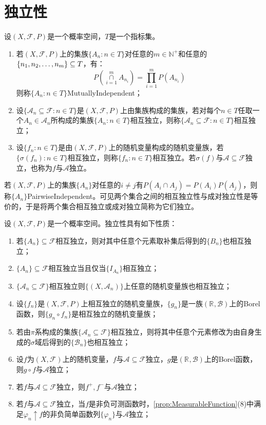 \section{独立性}
\begin{definition}
	设$(X,\mathscr{F},P)$是一个概率空间，$T$是一个指标集。
	\begin{enumerate}
		\item 若$(X,\mathscr{F},P)$上的集族$\{A_n:n\in T\}$对任意的$m\in\mathbb{N}^+$和任意的$\{n_1, n_2, \dots, n_{m}\}\subseteq T$，有：
		\begin{equation*}
			P\left(\underset{i=1}{\overset{m}{\cap}}A_{n_i}\right)=\prod_{i=1}^{m}P(A_{n_i})
		\end{equation*}
		则称$\{A_n:n\in T\}$\gls{MutuallyIndependent}；
		\item 设$\{\mathscr{A}_n\subseteq\mathscr{F}:n\in T\}$是$(X,\mathscr{F},P)$上由集族构成的集族，若对每个$n\in T$任取一个$A_n\in\mathscr{A}_n$所构成的集族$\{A_n:n\in T\}$相互独立，则称$\{\mathscr{A}_n\subseteq\mathscr{F}:n\in T\}$相互独立；
		\item 设$\{f_n:n\in T\}$是由$(X,\mathscr{F},P)$上的随机变量构成的随机变量族，若$\{\sigma(f_n):n\in T\}$相互独立，则称$\{f_n:n\in T\}$相互独立。若$\sigma(f)$与$\mathscr{A}\subseteq\mathscr{F}$独立，也称为$f$与$\mathscr{A}$独立。
	\end{enumerate}
	若$(X,\mathscr{F},P)$上的集族$\{A_n\}$对任意的$i\ne j$有$P(A_i\cap A_j)=P(A_i)P(A_j)$，则称$\{A_n\}$\gls{PairwiseIndependent}。可见两个集合之间的相互独立性与成对独立性是等价的，于是将两个集合相互独立或成对独立简称为它们独立。
\end{definition}
\begin{property}\label{prop:Independent}
	设$(X,\mathscr{F},P)$是一个概率空间。独立性具有如下性质：
	\begin{enumerate}
		\item 若$\{A_n\}\subseteq\mathscr{F}$相互独立，则对其中任意个元素取补集后得到的$\{B_n\}$也相互独立；
		\item $\{A_n\}\subseteq\mathscr{F}$相互独立当且仅当$\{I_{A_n}\}$相互独立；
		\item $\{\mathscr{A}_n\subseteq\mathscr{F}\}$相互独立则$\{(X,\mathscr{A}_n)\}$上任意的随机变量族也相互独立；
		\item 设$\{f_n\}$是$(X,\mathscr{F},P)$上相互独立的随机变量族，$\{g_n\}$是一族$(\mathbb{R}^{},\mathcal{B})$上的Borel函数，则$\{g_n\circ f_n\}$是相互独立的随机变量族；
		\item 若由$\pi$系构成的集族$\{\mathscr{A}_n\subseteq\mathscr{F}\}$相互独立，则将其中任意个元素修改为由自身生成的$\sigma$域后得到的$\{\mathscr{B}_n\}$也相互独立；
		\item 设$f$为$(X,\mathscr{F})$上的随机变量，$f$与$\mathscr{A}\subseteq\mathscr{F}$独立，$g$是$(\mathbb{R}^{},\mathcal{B})$上的Borel函数，则$g\circ f$与$\mathscr{A}$独立；
		\item 若$f$与$\mathscr{A}\subseteq\mathscr{F}$独立，则$f^+,f^-$与$\mathscr{A}$独立；
		\item 若$f$与$\mathscr{A}\subseteq\mathscr{F}$独立，当$f$是非负可测函数时，\cref{prop:MeasurableFunction}(8)中满足$\varphi_n\uparrow f$的非负简单函数列$\{\varphi_n\}$与$\mathscr{A}$独立；
	\end{enumerate}
\end{property}
